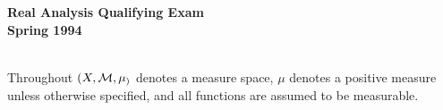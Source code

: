 \documentclass{article}
\begin{document}






\begin{center}\begin{LARGE}
{\bf Real Analysis Qualifying Exam}\\ 
{\bf Spring 1994}\\ \end{LARGE}
\end{center}
\vspace{0.1in}
\noindent\hrulefill\\

Throughout $(X, {\cal M}, \mu_)$ denotes a measure space, $\mu$ denotes a
positive measure unless otherwise specified, and all functions are
assumed to be measurable.
\end{document}
